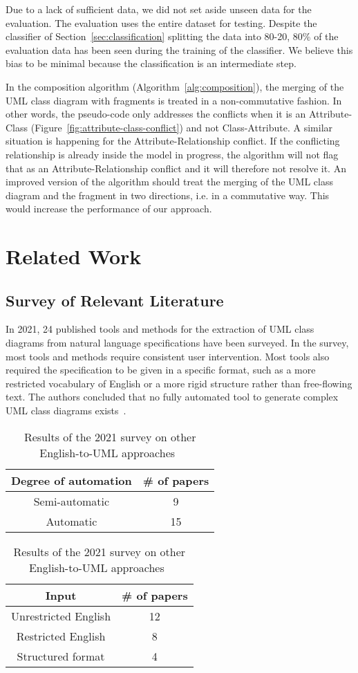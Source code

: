 \documentclass[sigconf]{acmart}
\begin{document}
Due to a lack of sufficient data, we did not set aside unseen data for the evaluation. The evaluation uses the entire dataset for testing. Despite the classifier of Section~\ref{sec:classification} splitting the data into 80-20, 80\% of the evaluation data has been seen during the training of the classifier. We believe this bias to be minimal because the classification is an intermediate step.

In the composition algorithm (Algorithm~\ref{alg:composition}), the merging of the UML class diagram with fragments is treated in a non-commutative fashion. In other words, the pseudo-code only addresses the conflicts when it is an Attribute-Class (Figure~\ref{fig:attribute-class-conflict}) and not Class-Attribute. A similar situation is happening for the Attribute-Relationship conflict. If the conflicting relationship is already inside the model in progress, the algorithm will not flag that as an Attribute-Relationship conflict and it will therefore not resolve it. An improved version of the algorithm should treat the merging of the UML class diagram and the fragment in two directions, i.e. in a commutative way. This would increase the performance of our approach.

\section{Related Work}
\label{sec:related}
\subsection{Survey of Relevant Literature}
In 2021, 24 published tools and methods for the extraction of UML class diagrams from natural language specifications have been surveyed. In the survey, most tools and methods require consistent user intervention. Most tools also required the specification to be given in a specific format, such as a more restricted vocabulary of English or a more rigid structure rather than free-flowing text. The authors concluded that no fully automated tool to generate complex UML class diagrams exists~\cite{Abdelnabi:2021}.

\begin{table}[h]
    \centering
    \begin{tabular}{|c|c|}
        \hline
        \textbf{Degree of automation} & \# of papers \\ \hline
        Semi-automatic & 9 \\ \hline
        Automatic & 15 \\ \hline
    \end{tabular}
    \qquad
    \begin{tabular}{|c|c|}
        \hline
        \textbf{Input} & \# of papers \\ \hline
        Unrestricted English & 12 \\ \hline
        Restricted English & 8 \\ \hline
        Structured format & 4 \\ \hline
    \end{tabular}
    \caption{Results of the 2021 survey on other English-to-UML approaches~\cite{Abdelnabi:2021}}
    \label{tab:uml-survey}
\end{table}
\end{document}
